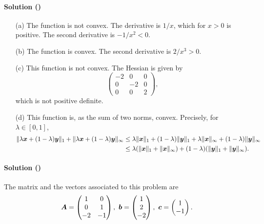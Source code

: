 \documentclass{article}
\newcounter{problems}
\renewcommand{\solution}[1]{\paragraph{Solution (\theproblems)}\addtocounter{problems}{1}\label{#1}}
\begin{document}
\solution{so3} 
\begin{itemize}
 \item[(a)] The function is not convex. The derivative is $1/x$, which for $x>0$ is positive. The second derivative is $-1/x^2<0$.
 \item[(b)] The function is convex. The second derivative is $2/x^3>0$.
 \item[(c)] This function is not convex. The Hessian is given by
 \begin{equation*}
  \begin{pmatrix} -2 & 0 & 0 \\
   0 & -2 & 0\\
   0 & 0 & 2
  \end{pmatrix},
 \end{equation*}
 which is not positive definite.
 \item[(d)] This function is, as the sum of two norms, convex. Precisely, for $\lambda \in [0,1]$,
 \begin{align*}
  \Vert {\lambda \bm{x}+(1-\lambda)\bm{y}}\Vert_1+\Vert {\lambda \bm{x}+(1-\lambda)\bm{y}}\Vert_\infty &\leq \lambda\Vert { \bm{x}}\Vert_1+(1-\lambda)\Vert {\bm{y}}\Vert_1+\lambda\Vert { \bm{x}}\Vert_\infty+(1-\lambda)\Vert {\bm{y}}\Vert_\infty\\
  &\leq \lambda(\Vert { \bm{x}}\Vert_1+\Vert { \bm{x}}\Vert_\infty)+(1-\lambda)(\Vert {\bm{y}}\Vert_1+\Vert {\bm{y}}\Vert_\infty).
 \end{align*}

\end{itemize}

\solution{p4} The matrix and the vectors associated to this problem are
\begin{equation*}
 \bm{A} = \begin{pmatrix}
            1 & 0\\
            0 & 1\\
            -2 & -1
           \end{pmatrix}, \
 \bm{b} = \begin{pmatrix}
            1 \\ 2 \\ -2
           \end{pmatrix}, \
 \bm{c} = \begin{pmatrix}
            1 \\ -1
           \end{pmatrix}.
\end{equation*}
\end{document}
